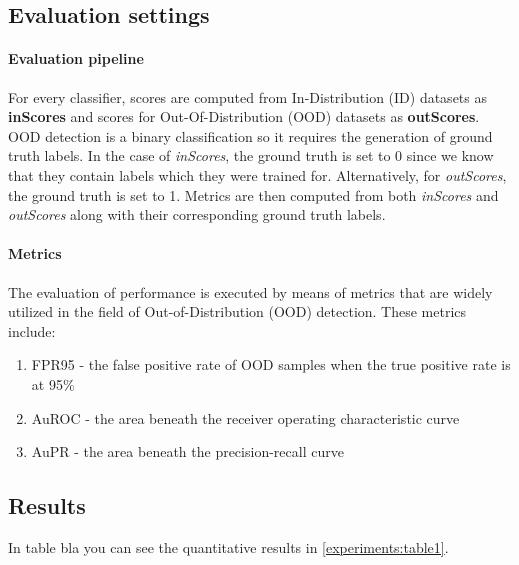 \subsection{Evaluation settings}
\paragraph{Evaluation pipeline}
For every classifier, scores are computed from In-Distribution (ID) datasets as \textbf{inScores} 
and scores for Out-Of-Distribution (OOD) datasets as \textbf{outScores}. 
OOD detection is a binary classification so it requires the generation of ground truth labels. 
In the case of \textit{inScores}, the ground truth is set to 0 since we know that they contain labels which they were trained for. 
Alternatively, for \textit{outScores}, the ground truth is set to 1. 
Metrics are then computed from both \textit{inScores} and \textit{outScores} along with their corresponding ground truth labels.

\paragraph{Metrics}
The evaluation of performance is executed by means of metrics that are widely utilized in the field of Out-of-Distribution (OOD) detection. 
These metrics include:

\begin{enumerate}[label=(\alph*)]
\item FPR95 - the false positive rate of OOD samples when the true positive rate is at 95\%
\item AuROC - the area beneath the receiver operating characteristic curve
\item AuPR - the area beneath the precision-recall curve
\end{enumerate}

\subsection{Results}
In table bla you can see the quantitative results in \autoref{experiments:table1}.

